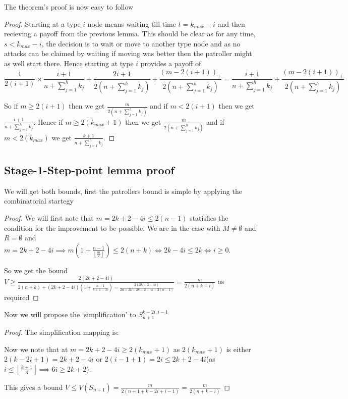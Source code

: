 \documentclass[a4paper,10pt]{article}
\newcommand{\denominator}{\ensuremath{n+\sum\limits_{j=1}^{h} k_{j}}}
\newcommand{\floor}[1]{\left \lfloor #1 \right \rfloor}
\newcommand{\pospart}[1]{\left( #1 \right)_{+}}
\theoremstyle{definition}
\theoremstyle{definition}
\theoremstyle{remark}
\theoremstyle{definition}
\begin{document}
The theorem's proof is now easy to follow

\begin{proof}
Starting at a type $i$ node means waiting till time $t=k_{max}-i$ and then recieving a payoff from the previous lemma. This should be clear as for any time, $s < k_{max}-i$, the decision is to wait or move to another type node and as no attacks can be claimed by waiting if moving was better then the patroller might as well start there.
Hence starting at type $i$ provides a payoff of
$$\frac{1}{2(i+1)} \times \frac{i+1}{\denominator} + \frac{2i+1}{2 \left( \denominator \right)} +\frac{\pospart{m-2(i+1)}}{2 \left( \denominator \right)}=\frac{i+1}{\denominator} +\frac{\pospart{m-2(i+1)}}{2 \left( \denominator \right)}$$

So if $m \geq 2(i+1)$ then we get $\frac{m}{2 \left( \denominator \right)}$ and if $m < 2(i+1)$ then we get $\frac{i+1}{\denominator}$. 
Hence if $m \geq 2(k_{max}+1)$ then we get $\frac{m}{2 \left( \denominator \right)}$ and if $m < 2(k_{max})$ we get $\frac{k+1}{\denominator}$.
\end{proof}


\subsection{Stage-1-Step-point lemma proof}
\label{Stage-1-Step-point lemma proof}
We will get both bounds, first the patrollers bound is simple by applying the combinatorial startegy
\begin{proof}
We will first note that $m=2k+2-4i \leq 2(n-1)$ statisfies the condition for the improvement to be possible. We are in the case with $M \neq \emptyset$ and $R = \emptyset$ and $m=2k+2-4i \implies m(1+\frac{n-1}{\floor{\frac{m}{2}}}) \leq 2(n+k) \iff 2k-4i \leq 2k \iff i \geq 0$.

So we get the bound $V \geq \frac{2(2k+2-4i)}{2(n+k)+(2k+2-4i)(1+\frac{n-1}{k+1-3i})=\frac{2(2k+2-4i)}{2n+2k+2k+2-4i+2(n-1)}}=\frac{m}{2(n+k-i)}$ as required 
\end{proof}

Now we will propose the `simplification' to $S_{n+1}^{k-2i,i-1}$
\begin{proof}
The simplification mapping is:


Now we note that at $m=2k+2-4i \geq 2(k_{max}+1)$ as $2(k_{max}+1)$ is either $2(k-2i+1)=2k+2-4i$ or $2(i-1+1)=2i \leq 2k+2-4i$(as $i \leq \floor{\frac{k+1}{3}} \implies 6i \geq 2k+2$). 

This gives a bound $V \leq V(S_{n+1})= \frac{m}{2(n+1+k-2i+i-1)}=\frac{m}{2(n+k-i)}$
\end{proof}
\end{document}
